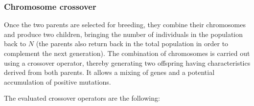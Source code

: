 \documentclass{ametsoc}
\begin{document}
\subsubsection{Chromosome crossover}

Once the two parents are selected for breeding, they combine their chromosomes and produce two children, bringing the number of individuals in the population back to $N$ (the parents also return back in the total population in order to complement the next generation). The combination of chromosomes is carried out using a crossover operator, thereby generating two offspring having characteristics derived from both parents. It allows a mixing of genes and a potential accumulation of positive mutations.

The evaluated crossover operators are the following:
\end{document}

